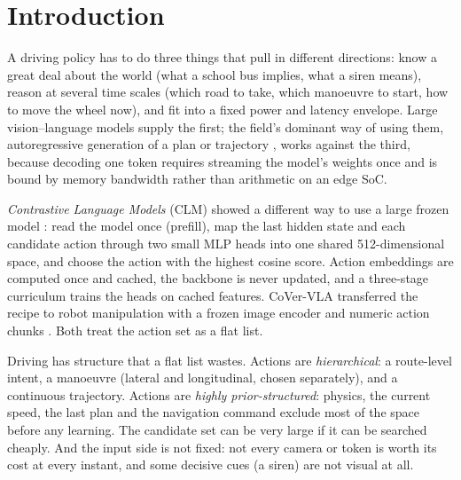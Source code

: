 \section{Introduction}\label{sec:intro}
A driving policy has to do three things that pull in different directions: know a great deal about the world (what a school bus
implies, what a siren means), reason at several time scales (which road to take, which manoeuvre to start, how to move the
wheel now), and fit into a fixed power and latency envelope. Large vision--language models supply the first; the field's dominant
way of using them, autoregressive generation of a plan or trajectory \citep{hwang2024emma,renz2025simlingo,nvidia2025alpamayor1},
works against the third, because decoding one token requires streaming the model's weights once and is bound by memory bandwidth rather than arithmetic on an edge SoC.

\emph{Contrastive Language Models} (CLM) showed a different way to use a large frozen model \citep{kwok2026clm}: read the model
once (prefill), map the last hidden state and each candidate action through two small MLP heads into one shared 512-dimensional
space, and choose the action with the highest cosine score. Action embeddings are computed once and cached, the backbone is never
updated, and a three-stage curriculum trains the heads on cached features. CoVer-VLA transferred the recipe to robot manipulation with
a frozen image encoder and numeric action chunks \citep{kwok2026cover}. Both treat the action set as a flat list.

Driving has structure that a flat list wastes. Actions are \emph{hierarchical}: a route-level intent, a manoeuvre (lateral and
longitudinal, chosen separately), and a continuous trajectory. Actions are \emph{highly prior-structured}: physics, the current
speed, the last plan and the navigation command exclude most of the space before any learning. The candidate set can be very large
if it can be searched cheaply. And the input side is not fixed: not every camera or token is worth its cost at every instant, and some
decisive cues (a siren) are not visual at all.

